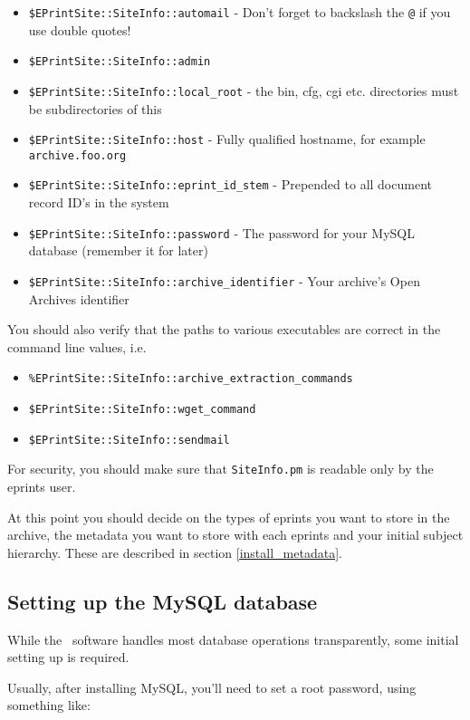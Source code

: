 \begin{itemize}
\item {\tt \$EPrintSite::SiteInfo::automail} - Don't forget to backslash the {\tt @} if you use double quotes!
\item {\tt \$EPrintSite::SiteInfo::admin}
\item {\tt \$EPrintSite::SiteInfo::local\_root} - the bin, cfg, cgi etc. directories must be subdirectories of this
\item {\tt \$EPrintSite::SiteInfo::host} - Fully qualified hostname, for example {\tt archive.foo.org}
\item {\tt \$EPrintSite::SiteInfo::eprint\_id\_stem} - Prepended to all document record ID's in the system
\item {\tt \$EPrintSite::SiteInfo::password} - The password for your MySQL database (remember it for later)
\item {\tt \$EPrintSite::SiteInfo::archive\_identifier} - Your archive's Open Archives identifier
\end{itemize}

You should also verify that the paths to various executables are correct in the command line values, i.e.

\begin{itemize}
\item {\tt \%EPrintSite::SiteInfo::archive\_extraction\_commands}
\item {\tt \$EPrintSite::SiteInfo::wget\_command}
\item {\tt \$EPrintSite::SiteInfo::sendmail}
\end{itemize}

For security, you should make sure that {\tt SiteInfo.pm} is readable only by the eprints user.

At this point you should decide on the types of eprints you want to store in the archive, the metadata you want to store with each eprints and your initial subject hierarchy. These are described in section \ref{install_metadata}.


\subsection{Setting up the MySQL database}

While the \eprints\ software handles most database operations transparently, some initial setting up is required.

Usually, after installing MySQL, you'll need to set a root password, using something like:

